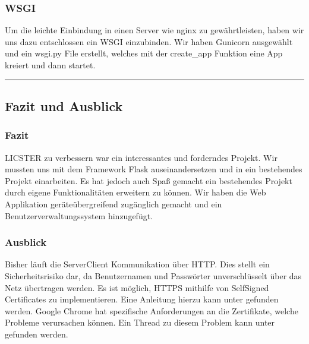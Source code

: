 \documentclass[letterpaper,10pt,ngerman]{sphinxmanual}
\begin{document}
\begin{sphinxVerbatim}[commandchars=\\\{\}]
 
\end{sphinxVerbatim}


\subsubsection{WSGI}
\label{\detokenize{webapp:wsgi}}
Um die leichte Einbindung in einen Server wie nginx zu gewährtleisten, haben wir uns dazu entschlossen ein WSGI einzubinden. Wir haben Gunicorn ausgewählt und ein wsgi.py File erstellt, welches mit der create\_app Funktion eine App kreiert und dann startet.


\bigskip\hrule\bigskip



\subsection{Fazit und Ausblick}
\label{\detokenize{webapp:fazit-und-ausblick}}

\subsubsection{Fazit}
\label{\detokenize{webapp:fazit}}
LICSTER zu verbessern war ein interessantes und forderndes Projekt. Wir mussten uns mit dem Framework Flask auseinandersetzen und in ein bestehendes Projekt einarbeiten. Es hat jedoch auch Spaß gemacht ein bestehendes Projekt durch eigene Funktionalitäten erweitern zu können. Wir haben die Web Applikation geräteübergreifend zugänglich gemacht und ein Benutzerverwaltungssystem hinzugefügt.


\subsubsection{Ausblick}
\label{\detokenize{webapp:ausblick}}
Bisher läuft die Server\sphinxhyphen{}Client Kommunikation über HTTP. Dies stellt ein Sicherheitsrisiko dar, da Benutzernamen und Passwörter unverschlüsselt über das Netz übertragen werden. Es ist möglich, HTTPS mithilfe von Self\sphinxhyphen{}Signed Certificates zu implementieren. Eine Anleitung hierzu kann unter  gefunden werden. Google Chrome hat spezifische Anforderungen an die Zertifikate, welche Probleme verursachen können. Ein Thread zu diesem Problem kann unter  gefunden werden.
\end{document}
